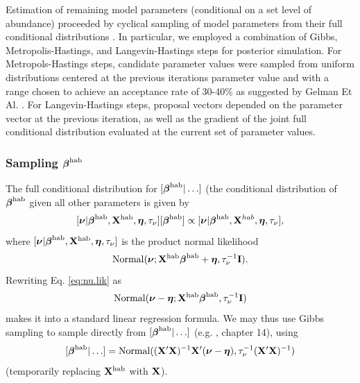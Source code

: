 \documentclass[10pt]{article}
\begin{document}
Estimation of remaining model parameters (conditional on a set level of abundance)  proceeded by cyclical sampling of model parameters from their full conditional distributions \cite{GelmanEtAl2004}.  In particular, we employed a combination of Gibbs, Metropolis-Hastings, and Langevin-Hastings \cite{RobertCasella2004} steps for posterior simulation.  For Metropols-Hastings steps, candidate parameter values were sampled from uniform distributions centered at the previous iterations parameter value and with a range chosen to achieve an acceptance rate of 30-40\% as suggested by Gelman Et Al. \cite{GelmanEtAl2004}.  For Langevin-Hastings steps, proposal vectors depended on the parameter vector at the previous iteration, as well as the gradient of the joint full conditional distribution evaluated at the current set of parameter values.

\subsubsection*{Sampling $\boldsymbol{\beta}^{\rm hab}$}

The full conditional distribution for $[\boldsymbol{\beta}^{\rm hab}|\hdots]$ (the conditional distribution of $\boldsymbol{\beta}^{\rm hab}$ given all other parameters is given by
$$
    [\boldsymbol{\nu} | \boldsymbol{\beta}^{\rm hab},{\bf X}^{\rm hab},\boldsymbol{\eta},\tau_\nu][\boldsymbol{\beta}^{\rm hab}]\propto[\boldsymbol{\nu} | \boldsymbol{\beta}^{\rm hab},{\bf X}^{hab},\boldsymbol{\eta},\tau_\nu],
$$
where $ [\boldsymbol{\nu} | \boldsymbol{\beta}^{\rm hab},{\bf X}^{\rm hab},\boldsymbol{\eta},\tau_\nu]$
is the product normal likelihood
\begin{equation} \label{eq:nu.lik}
{\rm Normal}(\boldsymbol{\nu};{\bf X}^{\rm hab} \boldsymbol{\beta}^{\rm hab} +\boldsymbol{\eta},\tau_\nu^{-1}{\bf I}).
\end{equation}
Rewriting Eq. \ref{eq:nu.lik} as
$$
{\rm Normal}(\boldsymbol{\nu}-\boldsymbol{\eta};{\bf X}^{\rm hab}\boldsymbol{\beta}^{\rm hab} ,\tau_\nu^{-1}{\bf I})
$$
makes it into a standard linear regression formula. We may
thus use Gibbs sampling to sample directly from $[\boldsymbol{\beta}^{\rm hab}|\hdots]$ (e.g. \cite{GelmanEtAl2004}, chapter 14), using
\begin{equation}
\label{eq:beta.post}
[\boldsymbol{\beta}^{\rm hab}|\hdots]={\rm Normal}(({\bf X}^\prime {\bf X})^{-1}{\bf X}^\prime (\boldsymbol{\nu}-\boldsymbol{\eta}),\tau_\nu^{-1}({\bf X}^\prime {\bf X})^{-1})
\end{equation}
(temporarily replacing ${\bf X}^{\rm hab}$ with ${\bf X}$).
\end{document}
